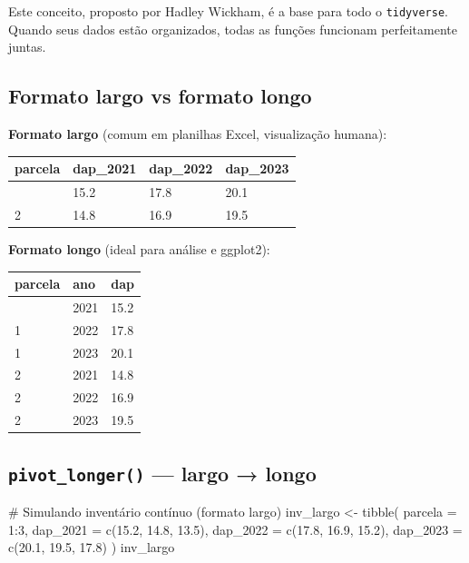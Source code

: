 \documentclass[
  letterpaper,
]{scrbook}
\newenvironment{Shaded}{\begin{snugshade}}{\end{snugshade}}
\newcommand{\AttributeTok}[1]{\textcolor[rgb]{0.40,0.45,0.13}{#1}}
\newcommand{\CommentTok}[1]{\textcolor[rgb]{0.37,0.37,0.37}{#1}}
\newcommand{\DecValTok}[1]{\textcolor[rgb]{0.68,0.00,0.00}{#1}}
\newcommand{\FloatTok}[1]{\textcolor[rgb]{0.68,0.00,0.00}{#1}}
\newcommand{\FunctionTok}[1]{\textcolor[rgb]{0.28,0.35,0.67}{#1}}
\newcommand{\NormalTok}[1]{\textcolor[rgb]{0.00,0.23,0.31}{#1}}
\newcommand{\OtherTok}[1]{\textcolor[rgb]{0.00,0.23,0.31}{#1}}
\newcommand{\SpecialCharTok}[1]{\textcolor[rgb]{0.37,0.37,0.37}{#1}}
\newcounter{none} %
\begin{document}
Este conceito, proposto por Hadley Wickham, é a base para todo o
\texttt{tidyverse}. Quando seus dados estão organizados, todas as
funções funcionam perfeitamente juntas.

\subsection{Formato largo vs formato
longo}\label{formato-largo-vs-formato-longo}

\textbf{Formato largo} (comum em planilhas Excel, visualização humana):

{\def\LTcaptype{none} %
\begin{longtable}[]{@{}llll@{}}
\toprule\noalign{}
parcela & dap\_2021 & dap\_2022 & dap\_2023 \\
\midrule\noalign{}
\endhead
\bottomrule\noalign{}
\endlastfoot
1 & 15.2 & 17.8 & 20.1 \\
2 & 14.8 & 16.9 & 19.5 \\
\end{longtable}
}

\textbf{Formato longo} (ideal para análise e ggplot2):

{\def\LTcaptype{none} %
\begin{longtable}[]{@{}lll@{}}
\toprule\noalign{}
parcela & ano & dap \\
\midrule\noalign{}
\endhead
\bottomrule\noalign{}
\endlastfoot
1 & 2021 & 15.2 \\
1 & 2022 & 17.8 \\
1 & 2023 & 20.1 \\
2 & 2021 & 14.8 \\
2 & 2022 & 16.9 \\
2 & 2023 & 19.5 \\
\end{longtable}
}

\subsection{\texorpdfstring{\texttt{pivot\_longer()} --- largo →
longo}{pivot\_longer() --- largo → longo}}\label{pivot_longer-largo-longo}

\begin{Shaded}
\begin{Highlighting}[]
\CommentTok{\# Simulando inventário contínuo (formato largo)}
\NormalTok{inv\_largo }\OtherTok{\textless{}{-}} \FunctionTok{tibble}\NormalTok{(}
  \AttributeTok{parcela =} \DecValTok{1}\SpecialCharTok{:}\DecValTok{3}\NormalTok{,}
  \AttributeTok{dap\_2021 =} \FunctionTok{c}\NormalTok{(}\FloatTok{15.2}\NormalTok{, }\FloatTok{14.8}\NormalTok{, }\FloatTok{13.5}\NormalTok{),}
  \AttributeTok{dap\_2022 =} \FunctionTok{c}\NormalTok{(}\FloatTok{17.8}\NormalTok{, }\FloatTok{16.9}\NormalTok{, }\FloatTok{15.2}\NormalTok{),}
  \AttributeTok{dap\_2023 =} \FunctionTok{c}\NormalTok{(}\FloatTok{20.1}\NormalTok{, }\FloatTok{19.5}\NormalTok{, }\FloatTok{17.8}\NormalTok{)}
\NormalTok{)}
\NormalTok{inv\_largo}
\end{Highlighting}
\end{Shaded}
\end{document}
